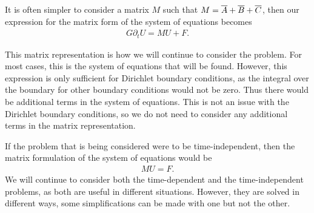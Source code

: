 \documentclass[../fem.tex]{subfile}
\begin{document}
It is often simpler to consider a matrix $M$ such that
$M=\overline{A}+\overline{B}+\overline{C}$, then our expression for the matrix form of the system
of equations becomes
\begin{align}\label{eq:matrix_simp}
   G\partial_tU=MU+F.
\end{align}

This matrix representation is how we will continue to consider the problem. For
most cases, this is the system of equations that will be found. However, this
expression is only sufficient for Dirichlet boundary conditions, as the
integral over the boundary for other boundary conditions would not be zero.
Thus there would be additional terms in the system of equations. This is not an
issue with the Dirichlet boundary conditions, so we do not need to consider any
additional terms in the matrix representation.

If the problem that is being considered were to be time-independent, then the
matrix formulation of the system of equations would be
\begin{align*}
   MU=F.
\end{align*}
We will continue to consider both the time-dependent and the time-independent
problems, as both are useful in different situations. However, they are solved
in different ways, some simplifications can be made with one but not the other.
\end{document}
